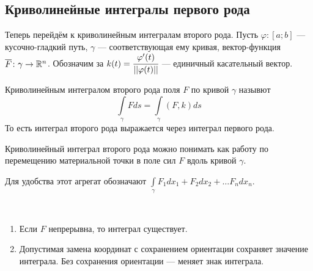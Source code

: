 \subsection{Криволинейные интегралы первого рода}
Теперь перейдём к криволинейным интегралам второго рода. Пусть $\varphi\colon [a;b]$ --- кусочно-гладкий путь, $\gamma$ --- соответствующая ему кривая, вектор-функция $\overline{F} \colon \gamma \to \mathbb{R}^n$. Обозначим за $k(t) = \cfrac{\varphi'(t)}{||\varphi(t)||}$ --- единичный касательный вектор.
\begin{Def}
    Криволинейным интегралом второго рода поля $F$ по кривой $\gamma$ назывют
    $$
        \int\limits_\gamma Fds = \int\limits_{\gamma} (F, k)ds
    $$
    То есть интеграл второго рода выражается через интеграл первого рода.
\end{Def}
Криволинейный интеграл второго рода можно понимать как работу по перемещению материальной точки в поле сил $F$ вдоль кривой $\gamma$.
\par Для удобства этот агрегат обозначают $\int\limits_\gamma F_1dx_1 + F_2dx_2 + \ldots F_ndx_n$. 
\begin{Properties}\ \\
    \begin{enumerate}
        \item Если $F$ непрерывна, то интеграл существует.
        \item Допустимая замена координат с сохранением ориентации сохраняет значение интеграла. Без сохранения ориентации --- меняет знак интеграла.
    \end{enumerate}
\end{Properties}
